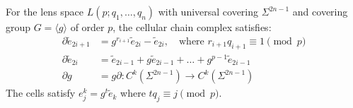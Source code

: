 For the lens space $L(p; q_1, \dots, q_n)$ with universal covering $\Sigma^{2n-1}$ and covering group $G = \langle g \rangle$ of order $p$, the cellular chain complex satisfies:
\begin{align*}
\partial \tilde{e}_{2i+1} &= g^{r_{i+1}} \tilde{e}_{2i} - \tilde{e}_{2i}, \quad \text{where } r_{i+1} q_{i+1} \equiv 1 \pmod{p} \\
\partial \tilde{e}_{2i} &= \tilde{e}_{2i-1} + g \tilde{e}_{2i-1} + \dots + g^{p-1} \tilde{e}_{2i-1} \\
\partial g &= g \partial: C^k(\Sigma^{2n-1}) \to C^k(\Sigma^{2n-1})
\end{align*}
The cells satisfy $e_j^k = g^t \tilde{e}_k$ where $t q_j \equiv j \pmod{p}$.
